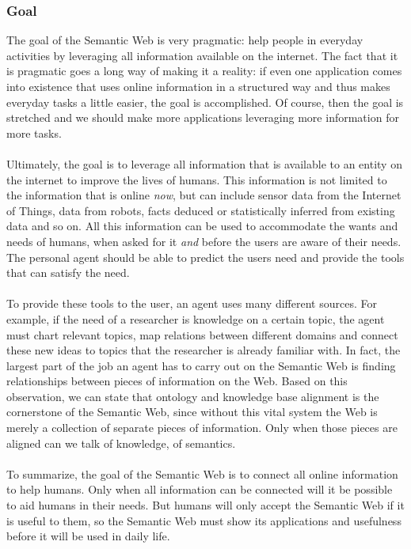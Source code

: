 \documentclass{article}
\begin{document}
 \subsubsection{Goal}
 The goal of the Semantic Web is very pragmatic: help people in everyday activities by leveraging all information available on the internet. The fact that it is pragmatic goes a long way of making it a reality: if even one application comes into existence that uses online information in a structured way and thus makes everyday tasks a little easier, the goal is accomplished. Of course, then the goal is stretched and we should make more applications leveraging more information for more tasks.
 \paragraph{}
 Ultimately, the goal is to leverage all information that is available to an entity on the internet to improve the lives of humans. This information is not limited to the information that is online \emph{now}, but can include sensor data from the Internet of Things, data from robots, facts deduced or statistically inferred from existing data and so on. All this information can be used to accommodate the wants and needs of humans, when asked for it \textit{and} before the users are aware of their needs. The personal agent should be able to predict the users need and provide the tools that can satisfy the need.
 \paragraph{}
 To provide these tools to the user, an agent uses many different sources. For example, if the need of a researcher is knowledge on a certain topic, the agent must chart relevant topics, map relations between different domains and connect these new ideas to topics that the researcher is already familiar with. In fact, the largest part of the job an agent has to carry out on the Semantic Web is finding relationships between pieces of information on the Web. Based on this observation, we can state that ontology and knowledge base alignment is the cornerstone  of the Semantic Web, since without this vital system the Web is merely a collection of separate pieces of information. Only when those pieces are aligned can we talk of knowledge, of semantics.
 \paragraph{}
 To summarize, the goal of the Semantic Web is to connect all online information to help humans. Only when all information can be connected will it be possible to aid humans in their needs. But humans will only accept the Semantic Web if it is useful to them, so the Semantic Web must show its applications and usefulness before it will be used in daily life.
\end{document}
